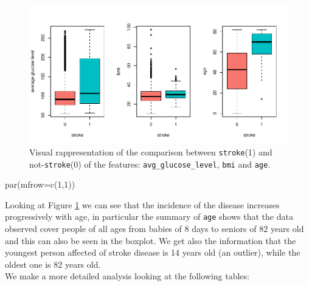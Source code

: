 \documentclass[
]{article}
\newenvironment{Shaded}{\begin{snugshade}}{\end{snugshade}}
\newcommand{\AttributeTok}[1]{\textcolor[rgb]{0.77,0.63,0.00}{#1}}
\newcommand{\DecValTok}[1]{\textcolor[rgb]{0.00,0.00,0.81}{#1}}
\newcommand{\FloatTok}[1]{\textcolor[rgb]{0.00,0.00,0.81}{#1}}
\newcommand{\FunctionTok}[1]{\textcolor[rgb]{0.00,0.00,0.00}{#1}}
\newcommand{\NormalTok}[1]{#1}
\newcommand{\OtherTok}[1]{\textcolor[rgb]{0.56,0.35,0.01}{#1}}
\newcommand{\SpecialCharTok}[1]{\textcolor[rgb]{0.00,0.00,0.00}{#1}}
\newcommand{\StringTok}[1]{\textcolor[rgb]{0.31,0.60,0.02}{#1}}
\begin{document}
\begin{figure}
\centering
\includegraphics{stat-project-stroke_files/figure-latex/bp_stroke-1.pdf}
\caption{\label{bp_stroke}Visual rappresentation of the comparison
between \texttt{stroke}(1) and not-\texttt{stroke}(0) of the features:
\texttt{avg\_glucose\_level}, \texttt{bmi} and \texttt{age}.}
\end{figure}

\begin{Shaded}
\begin{Highlighting}[]
\FunctionTok{par}\NormalTok{(}\AttributeTok{mfrow=}\FunctionTok{c}\NormalTok{(}\DecValTok{1}\NormalTok{,}\DecValTok{1}\NormalTok{))}
\end{Highlighting}
\end{Shaded}

Looking at Figure \ref{bp_stroke} we can see that the incidence of the
disease increases progressively with age, in particular the summary of
\texttt{age} shows that the data observed cover people of all ages from
babies of 8 days to seniors of 82 years old and this can also be seen in
the boxplot. We get also the information that the youngest person
affected of stroke disease is 14 years old (an outlier), while the
oldest one is 82 years old.\\
We make a more detailed analysis looking at the following tables:

\begin{Shaded}
\end{Shaded}
\end{document}
